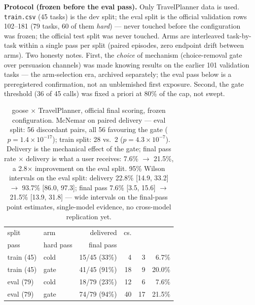 \documentclass[11pt,a4paper]{article}
\newcommand{\hdr}[1]{\textbf{#1}}
\begin{document}
\hdr{Protocol (frozen before the eval pass).} Only TravelPlanner data is
used. \texttt{train.csv} (45 tasks) is the dev split; the eval split is the
official validation rows 102--181 (79 tasks, 60 of them \emph{hard}) ---
never touched before the configuration was frozen; the official test split
was never touched. Arms are interleaved task-by-task within a single pass
per split (paired episodes, zero endpoint drift between arms). Two honesty
notes. First, the \emph{choice} of mechanism (choice-removal gate over
persuasion channels) was made knowing results on the earlier 101 validation
tasks --- the arm-selection era, archived separately; the eval pass below is
a preregistered confirmation, not an unblemished first exposure. Second,
the gate threshold (36 of 45 calls) was fixed a priori at 80\% of the cap,
not swept.

\begin{table}[h]
\centering\small
\begin{tabular}{llrrrr}
\toprule
split & arm & delivered & cs.\\ pass & hard pass & final pass \\
\midrule
train (45)   & cold  & 15/45 (33\%) & 4  & 3 & 6.7\% \\
train (45)   & gate  & 41/45 (91\%) & 18 & 9 & 20.0\% \\
\midrule
eval (79)    & cold  & 18/79 (23\%) & 12 & 6  & 7.6\% \\
eval (79)    & gate  & 74/79 (94\%) & 40 & 17 & 21.5\% \\
\bottomrule
\end{tabular}
\caption{goose $\times$ TravelPlanner, official final scoring, frozen
configuration. McNemar on paired delivery --- eval split: 56 discordant
pairs, all 56 favouring the gate ($p{=}1.4{\times}10^{-17}$); train split:
28 vs.\ 2 ($p{=}4.3{\times}10^{-7}$). Delivery is the mechanical effect of
the gate; final pass rate $\times$ delivery is what a user receives: 7.6\%
$\to$ 21.5\%, a 2.8$\times$ improvement on the eval split. 95\% Wilson
intervals on the eval split: delivery 22.8\% [14.9, 33.2] $\to$ 93.7\%
[86.0, 97.3]; final pass 7.6\% [3.5, 15.6] $\to$ 21.5\% [13.9, 31.8] ---
wide intervals on the final-pass point estimates, single-model evidence,
no cross-model replication yet.}
\label{tab:tp}
\end{table}
\end{document}
